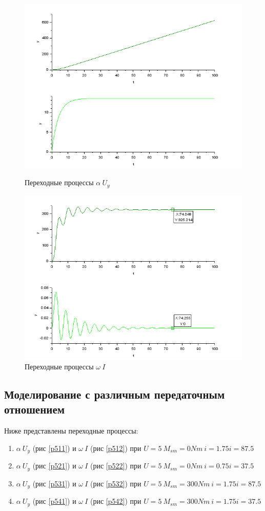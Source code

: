 \documentclass[a4paper,12pt,russian]{article} %
\begin{document}
\begin{figure}[H]
	\includegraphics[width=\linewidth]{421.png}
	\caption{Переходные процессы $\alpha\:  U_y$}\label{p421}
	\endminipage\hfill
	\includegraphics[width=\linewidth]{422.png}
	\caption{Переходные процессы $\omega\:  I$}\label{p422}
	\endminipage
\end{figure}

\subsection{Моделирование с различным передаточным отношением}
Ниже представлены переходные процессы:\\
\begin{enumerate}
	\item $\alpha\:  U_y$ (рис \ref{p511}) и $\omega\:  I$ (рис \ref{p512})  при  $U=5\: M_{sm}=0Nm\: i=1.75i=87.5$
	\item $\alpha\:  U_y$ (рис \ref{p521}) и $\omega\:  I$ (рис \ref{p522})  при  $U=5\: M_{sm}=0Nm\: i=0.75i=37.5$
	\item $\alpha\:  U_y$ (рис \ref{p531}) и $\omega\:  I$ (рис \ref{p532})  при  $U=5\: M_{sm}=300Nm\: i=1.75i=87.5$
	\item $\alpha\:  U_y$ (рис \ref{p541}) и $\omega\:  I$ (рис \ref{p542})  при  $U=5\: M_{sm}=300Nm\: i=1.75i=37.5$
\end{enumerate} 
\end{document}
